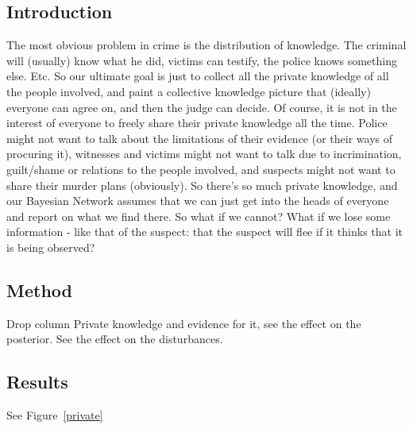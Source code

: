 \subsection{Introduction}
The most obvious problem in crime is the distribution of knowledge. The criminal will (usually) know what he did, victims can testify, the police knows something else. Etc. So our ultimate goal is just to collect all the private knowledge of all the people involved, and paint a collective knowledge picture that (ideally) everyone can agree on, and then the judge can decide. Of course, it is not in the interest of everyone to freely share their private knowledge all the time. Police might not want to talk about the limitations of their evidence (or their ways of procuring it), witnesses and victims might not want to talk due to incrimination, guilt/shame or relations to the people involved, and suspects might not want to share their murder plans (obviously). So there's so much private knowledge, and our Bayesian Network assumes that we can just get into the heads of everyone and report on what we find there. So what if we cannot? What if we lose some information - like that of the suspect: that the suspect will flee if it thinks that it is being observed?

\subsection{Method}
Drop column Private knowledge and evidence for it, see the effect on the posterior. See the effect on the disturbances.


\subsection{Results}


See Figure~\ref{private}

